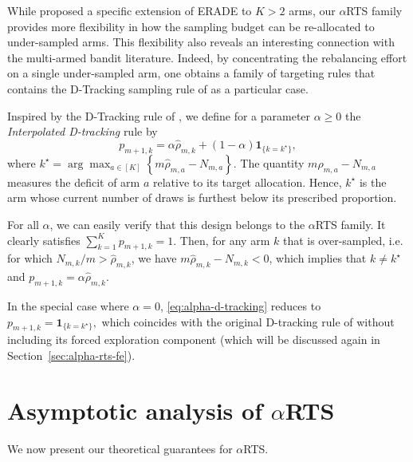 \smallskip

While \citet{alkhnefr2025efficient} proposed a specific extension of ERADE to $K>2$ arms, our $\alpha$RTS family provides more flexibility in how the sampling budget can be re-allocated to under-sampled arms. This flexibility also reveals an interesting connection with the
	multi-armed bandit literature. Indeed, by concentrating the rebalancing
	effort on a single under-sampled arm, one obtains a family of targeting
	rules that contains the D-Tracking sampling rule of \cite{garivier2016optimal} as a particular case.
	
	\begin{example}
		Inspired by the D-Tracking rule of \cite{garivier2016optimal}, we define for a parameter $\alpha \geq 0$ the \textit{Interpolated D-tracking} rule by
		\begin{equation}\label{eq:alpha-d-tracking}
			p_{m+1,k}
			=
			\alpha \hat \rho_{m,k}
			+
			(1-\alpha)\mathbf 1_{\{k=k^\star\}},
		\end{equation}
		where \(k^\star
		=
		\arg\max_{a\in[K]}
		\left\{
		m\hat \rho_{m,a}-N_{m,a}
		\right\}
		\). The quantity $m\hat \rho_{m,a}-N_{m,a}$ measures the deficit of arm $a$
		relative to its target allocation. Hence, $k^\star$ is the arm whose
		current number of draws is furthest below its prescribed proportion.
		
		For all $\alpha$, we can easily verify that this design belongs to the $\alpha$RTS family. It clearly satisfies $\sum_{k=1}^{K} p_{m+1,k}=1$. Then, for any arm $k$ that is over-sampled, i.e. for which $N_{m,k}/m > \hat \rho_{m,k}$, we have $m\hat \rho_{m,k}-N_{m,k} < 0$, which implies that $k\neq k^\star$ and \(p_{m+1,k}
		=
		\alpha \hat \rho_{m,k}\).
		
		
		In the special case where $\alpha=0$, \eqref{eq:alpha-d-tracking} reduces to \(p_{m+1,k}
		=
		\mathbf 1_{\{k=k^\star\}},\)
		which coincides with the original D-tracking rule of
		\citet{garivier2016optimal} without including its forced exploration component (which will be discussed again in Section~\ref{sec:alpha-rts-fe}).
\end{example}

\section{Asymptotic analysis of $\alpha$RTS} \label{sec:proof_vanilla}

We now present our theoretical guarantees for $\alpha$RTS.

